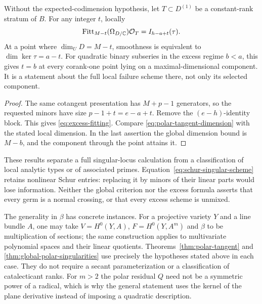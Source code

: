 \begin{proposition}
\label{prop:excess-polar}
Without the expected-codimension hypothesis, let $T\subset D^{(1)}$
be a constant-rank stratum of $B$. For any integer $t$, locally
\begin{equation}\label{eq:excess-fitting}
 \operatorname{Fitt}_{M-t}(\Omega_{D/\mathbb C})\mathcal O_T
       =I_{h-a+t}(\tau).
\end{equation}
At a point where $\dim_U D=M-t$, smoothness is equivalent to
$\dim\ker\tau=a-t$. For quadratic binary subseries in the excess
regime $b<a$, this gives $t=b$ at every corank-one point lying on a
maximal-dimensional component. It is a statement about the full local
failure scheme there, not only its selected component.
\end{proposition}
\begin{proof}
The same cotangent presentation has $M+p-1$ generators, so the
requested minors have size $p-1+t=e-a+t$. Remove the $(e-h)$-identity
block. This gives \eqref{eq:excess-fitting}. Compare
\eqref{eq:polar-tangent-dimension} with the stated local dimension.
In the last assertion the global dimension bound is $M-b$, and the
component through the point attains it.
\end{proof}

These results separate a full singular-locus calculation from a
classification of local analytic types or of associated primes.
Equation~\eqref{eq:schur-singular-scheme} retains nonlinear Schur
entries: replacing it by minors of their linear parts would lose
information. Neither the global criterion nor the excess formula
asserts that every germ is a normal crossing, or that every excess
scheme is unmixed.

The generality in $\beta$ has concrete instances. For a projective
variety $Y$ and a line bundle $A$, one may take
$V=H^0(Y,A)$, $F=H^0(Y,A^m)$ and $\beta$ to be multiplication of
sections; the same construction applies to multivariate polynomial
spaces and their linear quotients. Theorems~\ref{thm:polar-tangent}
and \ref{thm:global-polar-singularities} use precisely the hypotheses
stated above in each case. They do not require a secant
parameterization or a classification of catalecticant ranks. For
$m>2$ the polar residual $Q$ need not be a symmetric power of a
radical, which is why the general statement uses the kernel of the
plane derivative instead of imposing a quadratic description.
